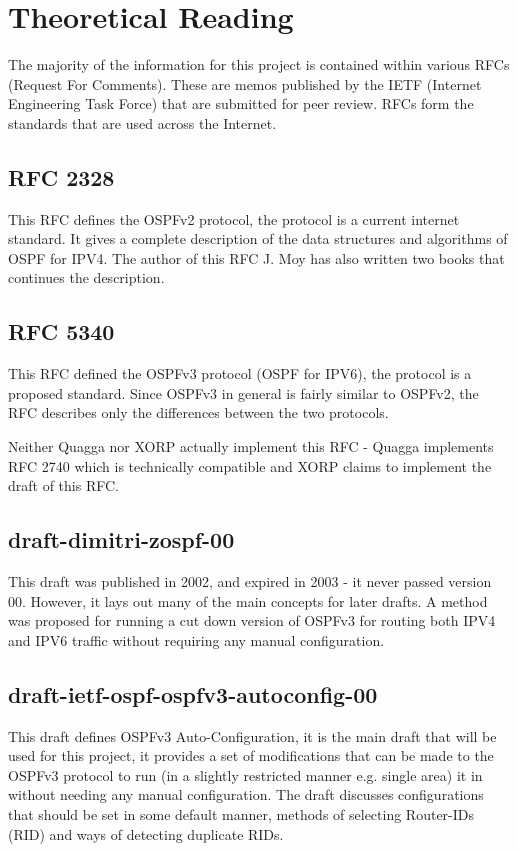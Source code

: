 \documentclass[12pt]{report}
\begin{document}
\section{Theoretical Reading}
The majority of the information for this project is contained within various
RFCs (Request For Comments).  These are memos published by the IETF (Internet
Engineering Task Force) that are submitted for peer review.  RFCs form the
standards that are used across the Internet.

\subsection{RFC 2328} 
This RFC defines the OSPFv2 protocol, the protocol is a current internet
standard. It gives a complete description of the data structures and algorithms
of OSPF for IPV4. The author of this RFC J. Moy has also written two books that
continues the description. 

\subsection{RFC 5340}
This RFC defined the OSPFv3 protocol (OSPF for IPV6), the protocol is a
proposed standard.  Since OSPFv3 in general is fairly similar to OSPFv2,
the RFC describes only the differences between the two protocols. 

Neither Quagga nor XORP actually implement this RFC - Quagga implements
RFC 2740 which is technically compatible and XORP claims to implement
the draft of this RFC. 

\subsection{draft-dimitri-zospf-00}
This draft was published in 2002, and expired in 2003 - it never passed
version 00.  However, it lays out many of the main concepts for later
drafts.  A method was proposed for running a cut down version of OSPFv3
for routing both IPV4 and IPV6 traffic without requiring any manual
	configuration. 

\subsection{draft-ietf-ospf-ospfv3-autoconfig-00} 
This draft defines OSPFv3 Auto-Configuration, it is the main draft that will be
used for this project, it provides a set of modifications that can be made to
the OSPFv3 protocol to run (in a slightly restricted manner e.g.  single area)
it in without needing any manual configuration.  The draft discusses
configurations that should be set in some default manner, methods of selecting
Router-IDs (RID) and ways of detecting duplicate RIDs. 
\end{document}
